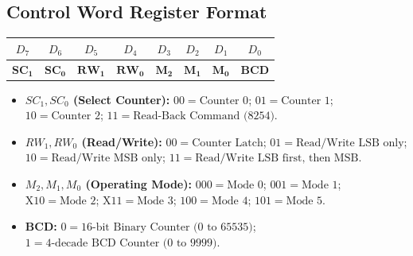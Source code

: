 \documentclass[12pt,a4paper]{article}
\begin{document}
\subsection{Control Word Register Format}
\begin{tcolorbox}[formulabox, title={8253/8254 Control Word Format}]
\centering
\begin{tabular}{|c|c|c|c|c|c|c|c|}
\hline
\textbf{$D_7$} & \textbf{$D_6$} & \textbf{$D_5$} & \textbf{$D_4$} & \textbf{$D_3$} & \textbf{$D_2$} & \textbf{$D_1$} & \textbf{$D_0$} \\ \hline
$\mathbf{SC_1}$ & $\mathbf{SC_0}$ & $\mathbf{RW_1}$ & $\mathbf{RW_0}$ & $\mathbf{M_2}$ & $\mathbf{M_1}$ & $\mathbf{M_0}$ & $\mathbf{BCD}$ \\ \hline
\end{tabular}
\par\vspace{4pt}\raggedright
\begin{itemize}[leftmargin=*, itemsep=2pt]
  \item \textbf{$SC_1, SC_0$ (Select Counter):} $00 = \text{Counter 0}$; $01 = \text{Counter 1}$; $10 = \text{Counter 2}$; $11 = \text{Read-Back Command (8254)}$.
  \item \textbf{$RW_1, RW_0$ (Read/Write):} $00 = \text{Counter Latch}$; $01 = \text{Read/Write LSB only}$; $10 = \text{Read/Write MSB only}$; $11 = \text{Read/Write LSB first, then MSB}$.
  \item \textbf{$M_2, M_1, M_0$ (Operating Mode):} $000 = \text{Mode 0}$; $001 = \text{Mode 1}$; $\mathrm{X}10 = \text{Mode 2}$; $\mathrm{X}11 = \text{Mode 3}$; $100 = \text{Mode 4}$; $101 = \text{Mode 5}$.
  \item \textbf{BCD:} $0 = \text{16-bit Binary Counter (0 to 65535)}$; $1 = \text{4-decade BCD Counter (0 to 9999)}$.
\end{itemize}
\end{tcolorbox}
\end{document}
